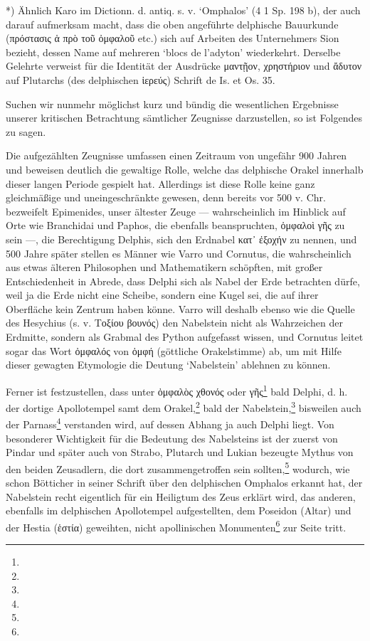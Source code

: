 \documentclass[a4paper, 11pt, oneside]{article}
\begin{document}
*) Ähnlich Karo im Dictionn. d. antiq. s. v. `Omphalos' (4 1 Sp. 198 b), der auch darauf aufmerksam macht, dass die oben angeführte delphische Bauurkunde (πρόστασις ἁ πρὸ τοῦ ὀμφαλοῦ etc.) sich auf Arbeiten des Unternehmers Sion bezieht, dessen Name auf mehreren `blocs de l'adyton' wiederkehrt. Derselbe Gelehrte verweist für die Identität der Ausdrücke μαντῇον, χρηστήριον und ἄδυτον auf Plutarchs (des delphischen ἱερεύς) Schrift de Is. et Os. 35.

Suchen wir nunmehr möglichst kurz und bündig die wesentlichen Ergebnisse unserer kritischen Betrachtung sämtlicher Zeugnisse darzustellen, so ist Folgendes zu sagen.

Die aufgezählten Zeugnisse umfassen einen Zeitraum von ungefähr 900 Jahren und beweisen deutlich die gewaltige Rolle, welche das delphische Orakel innerhalb dieser langen Periode gespielt hat. Allerdings ist diese Rolle keine ganz gleichmäßige und uneingeschränkte gewesen, denn bereits vor 500 v. Chr. bezweifelt Epimenides, unser ältester Zeuge --- wahrscheinlich im Hinblick auf Orte wie Branchidai und Paphos, die ebenfalls beanspruchten, ὀμφαλοὶ γῆς zu sein ---, die Berechtigung Delphis, sich den Erdnabel κατ᾽ ἐξοχήν zu nennen, und 500 Jahre später stellen es Männer wie Varro und Cornutus, die wahrscheinlich aus etwas älteren Philosophen und Mathematikern schöpften, mit großer Entschiedenheit in Abrede, dass Delphi sich als Nabel der Erde betrachten dürfe, weil ja die Erde nicht eine Scheibe, sondern eine Kugel sei, die auf ihrer Oberfläche kein Zentrum haben könne. Varro will deshalb ebenso wie die Quelle des Hesychius (s. v. Τοξίου βουνός) den Nabelstein nicht als Wahrzeichen der Erdmitte, sondern als Grabmal des Python aufgefasst wissen, und Cornutus leitet sogar das Wort ὀμφαλός von ὀμφή (göttliche Orakelstimme) ab, um mit Hilfe dieser gewagten Etymologie die Deutung `Nabelstein' ablehnen zu können.

Ferner ist festzustellen, dass unter ὀμφαλὸς χθονός oder γῆς\footnote{} bald Delphi, d. h. der dortige Apollotempel samt dem Orakel,\footnote{} bald der Nabelstein,\footnote{} bisweilen auch der Parnass\footnote{} verstanden wird, auf dessen Abhang ja auch Delphi liegt. Von besonderer Wichtigkeit für die Bedeutung des Nabelsteins ist der zuerst von Pindar und später auch von Strabo, Plutarch und Lukian bezeugte Mythus von den beiden Zeusadlern, die dort zusammengetroffen sein sollten,\footnote{} wodurch, wie schon Bötticher in seiner Schrift über den delphischen Omphalos erkannt hat, der Nabelstein recht eigentlich für ein Heiligtum des Zeus erklärt wird, das anderen, ebenfalls im delphischen Apollotempel aufgestellten, dem Poseidon (Altar) und der Hestia (ἑστία) geweihten, nicht apollinischen Monumenten\footnote{} zur Seite tritt.
\end{document}
